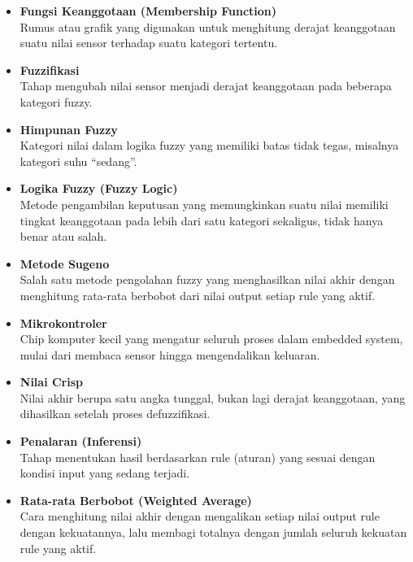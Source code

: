 \documentclass[12pt,a4paper]{article}
\begin{document}
\begin{itemize}[label={}, leftmargin=0pt, itemsep=0.35cm]
    \item \textbf{Fungsi Keanggotaan (Membership Function)}\\
    Rumus atau grafik yang digunakan untuk menghitung derajat keanggotaan suatu nilai sensor terhadap suatu kategori tertentu.

    \item \textbf{Fuzzifikasi}\\
    Tahap mengubah nilai sensor menjadi derajat keanggotaan pada beberapa kategori fuzzy.

    \item \textbf{Himpunan Fuzzy}\\
    Kategori nilai dalam logika fuzzy yang memiliki batas tidak tegas, misalnya kategori suhu ``sedang''.

    \item \textbf{Logika Fuzzy (Fuzzy Logic)}\\
    Metode pengambilan keputusan yang memungkinkan suatu nilai memiliki tingkat keanggotaan pada lebih dari satu kategori sekaligus, tidak hanya benar atau salah.

    \item \textbf{Metode Sugeno}\\
    Salah satu metode pengolahan fuzzy yang menghasilkan nilai akhir dengan menghitung rata-rata berbobot dari nilai output setiap rule yang aktif.

    \item \textbf{Mikrokontroler}\\
    Chip komputer kecil yang mengatur seluruh proses dalam embedded system, mulai dari membaca sensor hingga mengendalikan keluaran.

    \item \textbf{Nilai Crisp}\\
    Nilai akhir berupa satu angka tunggal, bukan lagi derajat keanggotaan, yang dihasilkan setelah proses defuzzifikasi.

    \item \textbf{Penalaran (Inferensi)}\\
    Tahap menentukan hasil berdasarkan rule (aturan) yang sesuai dengan kondisi input yang sedang terjadi.

    \item \textbf{Rata-rata Berbobot (Weighted Average)}\\
    Cara menghitung nilai akhir dengan mengalikan setiap nilai output rule dengan kekuatannya, lalu membagi totalnya dengan jumlah seluruh kekuatan rule yang aktif.


\end{itemize}
\end{document}
